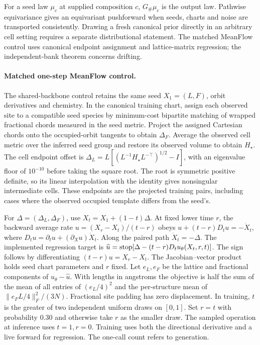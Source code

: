 For a seed law \(\mu_c\) at supplied composition \(c\), \(G_\#\mu_c\) is the output law.
Pathwise equivariance gives an equivariant pushforward when seeds, charts and noise are
transported consistently. Drawing a fresh canonical prior directly in an arbitrary cell setting
requires a separate distributional statement. The matched MeanFlow control uses canonical
endpoint assignment and lattice-matrix regression; the independent-bank theorem concerns drifting.

\paragraph{Matched one-step MeanFlow control.}
The shared-backbone control retains the same seed \(X_1=(L,F)\), orbit derivatives and
chemistry. In the canonical training chart, assign each observed site to a compatible
seed species by minimum-cost bipartite matching of wrapped fractional chords measured in
the seed metric. Project the assigned Cartesian chords onto the occupied-orbit tangents
to obtain \(\Delta_F\). Average the observed cell metric over the inferred seed group
and restore its observed volume to obtain \(H_\star\). The cell endpoint offset is
\(\Delta_L=L[(L^{-1}H_\star L^{-\top})^{1/2}-I]\), with an eigenvalue
floor of \(10^{-10}\) before taking the square root. The root is symmetric positive
definite, so its linear interpolation with the identity gives nonsingular intermediate
cells. These endpoints are the projected training pairs, including cases where the
observed occupied template differs from the seed's.

For \(\Delta=(\Delta_L,\Delta_F)\), use \(X_t=X_1+(1-t)\Delta\). At fixed lower time
\(r\), the backward average rate \(u=(X_r-X_t)/(t-r)\) obeys
\(u+(t-r)D_tu=-\dot X_t\), where
\(D_tu=\partial_tu+(\partial_Xu)\dot X_t\). Along the paired path
\(\dot X_t=-\Delta\). The implemented regression target is
\(\widehat u={\rm stop}[\Delta-(t-r)D_tu_\theta(X_t,r,t)]\).
The sign follows by differentiating \((t-r)u=X_r-X_t\). The Jacobian--vector
product holds seed chart parameters and \(r\) fixed. Let \(e_L,e_F\) be the
lattice and fractional components of \(u_\theta-\widehat u\). With lengths in
angstroms the objective is half the sum of the mean of all entries of \((e_L/4)^2\)
and the per-structure mean of \(\|e_F L/4\|_F^2/(3N)\). Fractional site padding
has zero displacement. In training, \(t\) is the greater of two independent uniform
draws on \([0,1]\). Set \(r=t\) with probability \(0.30\) and otherwise take \(r\)
as the smaller draw. The sampled operation at inference uses \(t=1,r=0\).
Training uses both the directional derivative and a live forward for regression.
The one-call count refers to generation.

